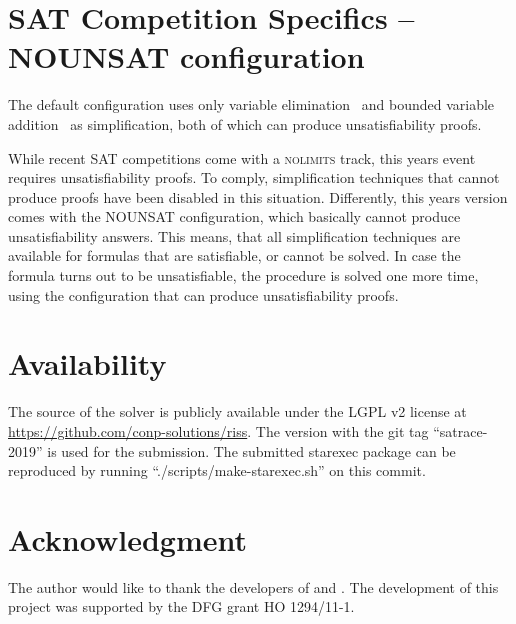 \documentclass[conference]{IEEEtran}
\begin{document}
\section{SAT Competition Specifics -- NOUNSAT configuration}

The default configuration uses only variable elimination~\cite{EenB:2005} and bounded variable addition~\cite{Mbva} as simplification, both of which can produce unsatisfiability proofs.
\newpage

While recent SAT competitions come with a \textsc{nolimits} track, this years event requires unsatisfiability proofs.
To comply, simplification techniques that cannot produce proofs have been disabled in this situation.
Differently, this years version comes with the \textsc{NOUNSAT} configuration, which basically cannot produce unsatisfiability answers.
This means, that all simplification techniques are available for formulas that are satisfiable, or cannot be solved.
In case the formula turns out to be unsatisfiable, the procedure is solved one more time, using the configuration that can produce unsatisfiability proofs.

\section{Availability}

The source of the solver is publicly available under the LGPL v2 license at \url{https://github.com/conp-solutions/riss}.
The version with the git tag ``satrace-2019'' is used for the submission.
The submitted starexec package can be reproduced by running ``./scripts/make-starexec.sh'' on this commit.

\section*{Acknowledgment}
The author would like to thank the developers of \glucose and \minisat. 
The development of this project was supported by the DFG grant HO 1294/11-1.



\end{document}
